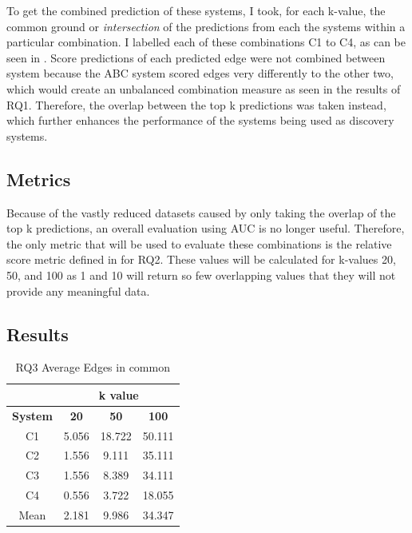 \documentclass{l4proj}
\begin{document}
To get the combined prediction of these systems, I took, for each k-value, the common ground or \textit{intersection} of the predictions from each the systems within a particular combination. I labelled each of these combinations C1 to C4, as can be seen in . Score predictions of each predicted edge were not combined between system because the ABC system scored edges very differently to the other two, which would create an unbalanced combination measure as seen in the results of RQ1. Therefore, the overlap between the top k predictions was taken instead, which further enhances the performance of the systems being used as discovery systems. \\

\subsection{Metrics}

Because of the vastly reduced datasets caused by only taking the overlap of the top k predictions, an overall evaluation using AUC is no longer useful. Therefore, the only metric that will be used to evaluate these combinations is the relative score metric defined in for RQ2. These values will be calculated for k-values 20, 50, and 100 as 1 and 10 will return so few overlapping values that they will not provide any meaningful data.\\

\subsection{Results}

\begin{table}[h]
    \centering
    \caption{RQ3 Average Edges in common}
    \label{tab:rq3_common}
    \begin{tabular}{|c|c|c|c|}
    \hline
    & \multicolumn{3}{|c|}{k value}\\ \hline
    \textbf{System} & \textbf{20} & \textbf{50} & \textbf{100} \\ \hline
    C1 & 5.056 & 18.722 & 50.111  \\ \hline
    C2 & 1.556 & 9.111 & 35.111\\ \hline
    C3 & 1.556 & 8.389 & 34.111\\ \hline
    C4 & 0.556 & 3.722 & 18.055\\ \hline
    Mean & 2.181 & 9.986 & 34.347\\ \hline
    \end{tabular}
\end{table}
\end{document}
